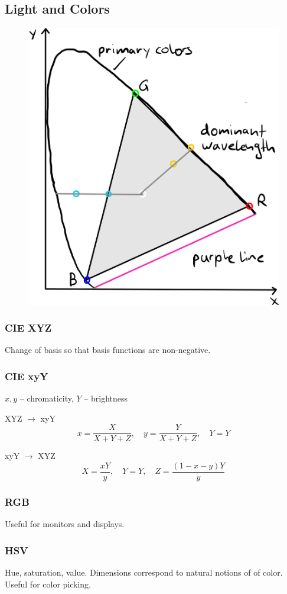 \documentclass[a4paper,10pt]{article}
\begin{document}
\subsection{Light and Colors}
\begin{figure}[h]
    \centering
    \includegraphics[width=0.6\linewidth]{ciergb.jpeg}
\end{figure}

\subsubsection{CIE XYZ}
Change of basis so that basis functions are non-negative.

\subsubsection{CIE xyY}
\(x, y\) -- chromaticity, \(Y\) -- brightness
\begin{subbox}{XYZ \(\to\) xyY}
    \[x = \frac{X}{X + Y + Z}, \quad y = \frac{Y}{X + Y +Z}, \quad Y = Y\]
\end{subbox}
\begin{subbox}{xyY \(\to\) XYZ}
    \[X = \frac{xY}{y}, \quad Y = Y, \quad Z = \frac{(1 - x - y)Y}{y}\]
\end{subbox}

\subsubsection{RGB}
Useful for monitors and displays.

\subsubsection{HSV}
Hue, saturation, value. Dimensions correspond to natural notions of  of color. Useful for color picking.
\end{document}
